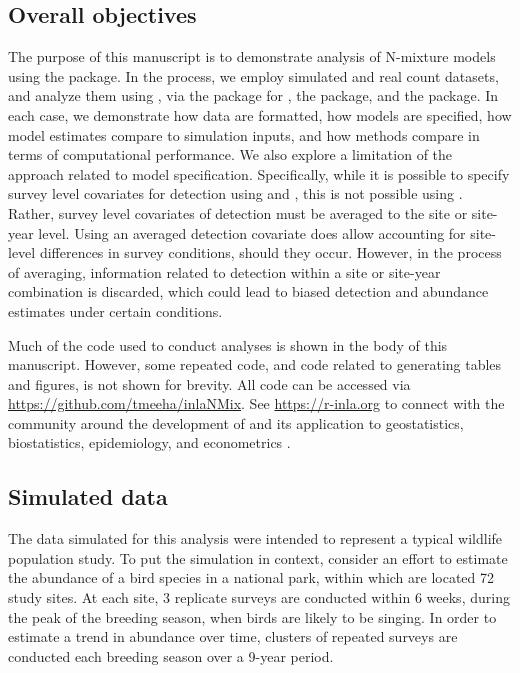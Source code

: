 \documentclass[article]{jss}
\begin{document}
\subsection[Overall objectives]{Overall objectives}
The purpose of this manuscript is to demonstrate analysis of N-mixture models using the  package. In the process, we employ simulated and real count datasets, and analyze them using , via the  package \citep{Denwood_2016} for , the  package, and the  package. In each case, we demonstrate how data are formatted, how models are specified, how model estimates compare to simulation inputs, and how methods compare in terms of computational performance. We also explore a limitation of the  approach related to model specification. Specifically, while it is possible to specify survey level covariates for detection using  and , this is not possible using . Rather, survey level covariates of detection must be averaged to the site or site-year level. Using an averaged detection covariate does allow accounting for site-level differences in survey conditions, should they occur. However, in the process of averaging, information related to detection within a site or site-year combination is discarded, which could lead to biased detection and abundance estimates under certain conditions.

Much of the code used to conduct analyses is shown in the body of this manuscript. However, some repeated code, and code related to generating tables and figures, is not shown for brevity. All code can be accessed via \url{https://github.com/tmeeha/inlaNMix}. See \url{https://r-inla.org} to connect with the community around the development of  and its application to geostatistics, biostatistics, epidemiology, and econometrics \citep{Lindgren_Rue_2015,Blangiardo_Cameletti_2015}.

\subsection[Simulated data]{Simulated data}
The data simulated for this analysis were intended to represent a typical wildlife population study. To put the simulation in context, consider an effort to estimate the abundance of a bird species in a national park, within which are located 72 study sites. At each site, 3 replicate surveys are conducted within 6 weeks, during the peak of the breeding season, when birds are likely to be singing. In order to estimate a trend in abundance over time, clusters of repeated surveys are conducted each breeding season over a 9-year period.
\end{document}
